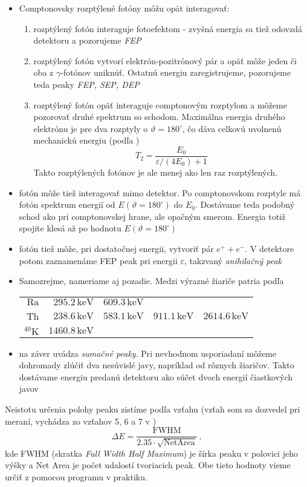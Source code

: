 \documentclass[a4paper, 10pt]{article}
\newcommand{\unit}[1]{\ensuremath{\, \mathrm{#1}}}
\begin{document}
\begin{itemize}
    \item Comptonovsky rozptýlené fotóny môžu opät interagovať:
    \begin{enumerate}
        \item rozptýlený fotón interaguje fotoefektom - zvyšná energia sa tiež odovzdá detektoru a pozorujeme \textit{FEP}
        \item rozptýlený fotón vytvorí elektrón-pozitrónový pár a opäť môže jeden či oba z $\gamma$-fotónov uniknúť. Ostatnú energiu zaregistrujeme, pozorujeme teda peaky \textit{FEP, SEP, DEP}
        \item rozptýlený fotón opäť interaguje comptonovým rozptylom a môžeme pozorovať druhé spektrum so schodom. Maximálna energia druhého elektrónu je pre dva rozptyly o $\vartheta = 180^\circ$, čo dáva celkovú uvolnenú mechanickú energiu (podľa \cite{stud})
        \begin{equation}
            \label{teor:eq:compton:max2}
            T_2 = \frac{E_0}{\varepsilon/(4E_0)+1}
        \end{equation}
        Takto rozptýlených fotónov je ale menej ako len raz rozptýlených. 

    \end{enumerate}
    \item fotón môže tiež interagovať mimo detektor. Po comptonovskom rozptyle má fotón spektrum energií od $E(\vartheta=180^\circ)$ do $E_0$. Dostávame teda podobný schod ako pri comptonovskej hrane, ale opačným smerom. Energia totiž spojite klesá až po hodnotu $E(\vartheta=180^\circ)$
    \item fotón tiež môže, pri dostatočnej energii, vytvoriť pár $e^+ + e^-$. V detektore potom zaznamenáme FEP peak pri energii $\varepsilon$, takzvaný \textit{anihilačný peak}
    \item Samozrejme, nameriame aj pozadie. Medzi výrazné žiariče patria podľa \cite{stud} 
    \\
    \begin{tabular}{r|rrrr}
    $\mathrm{Ra}$ & $295.2\unit{keV}$ &$609.3\unit{keV}$
    \\Th & $238.6\unit{keV}$& $583.1\unit{keV}$& $911.1\unit{keV}$& $2614.6\unit{keV}$
    \\$^{40}\mathrm{K}$ &$1460.8\unit{keV}$
    \end{tabular}

    \item na záver uvádza \cite{stud} \textit{sumačné peaky}. Pri nevhodnom usporiadaní môžeme dohromady zlúčiť dva nesúvislé javy, napríklad od rôznych žiaričov. Takto dostávame energiu predanú detektoru ako súčet dvoch energií čiastkových javov
    
 \end{itemize}
Neistotu určenia polohy peaku zistíme podľa vzťahu (vzťah som sa dozvedel pri meraní, vychádza zo vzťahov 5, 6 a 7 v \cite{stud5})
\begin{equation}
\label{eq:teor:chyba}
\Delta E = \frac{\mathrm{FWHM}}{2.35\cdot \sqrt{\mathrm{Net Area}}}\,,
\end{equation}
kde FWHM (skratka \textit{Full Width Half Maximum}) je šírka peaku v polovici jeho výšky a Net Area je počet udalostí tvoriacich peak. Obe tieto hodnoty vieme určiť z pomocou programu v praktiku.
\end{document}
